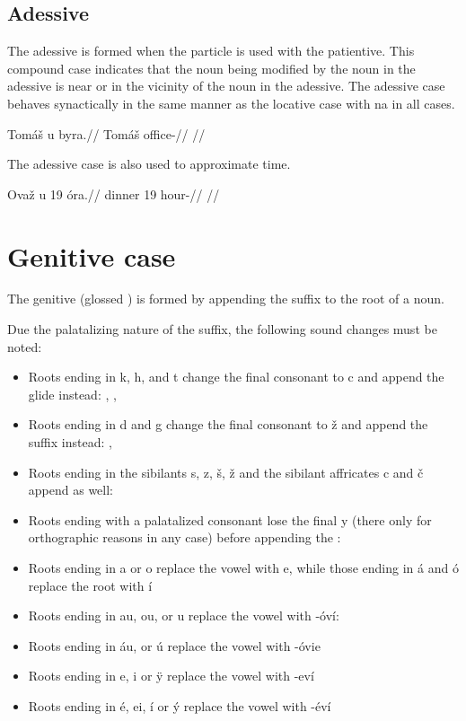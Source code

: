 \subsection{Adessive}
The adessive is formed when the particle  is used with the patientive. This compound case indicates that the noun being modified by the noun in the adessive is near or in the vicinity of the noun in the adessive. The adessive case behaves synactically in the same manner as the locative case with na in all cases.

\pex
\begingl
\gla Tom\'a\v{s} u byra.//
\glb Tom\'a\v{s}  office-//
\glft {}//
\endgl
\xe

The adessive case is also used to approximate time.

\pex
\begingl
\gla Ova\v{z} u 19 \'ora.//
\glb dinner  19 hour-//
\glft {}//
\endgl
\xe

\section{Genitive case}

The genitive (glossed ) is formed by appending the suffix  to the root of a noun.

Due the palatalizing nature of the suffix, the following sound changes must be noted:

\begin{itemize}
	\item Roots ending in k, h, and t change the final consonant to c and append the glide  instead:  ,  ,  
	\item Roots ending in d and g change the final consonant to \v{z} and append the suffix  instead:  ,  
	\item Roots ending in the sibilants s, z, \v{s}, \v{z} and the sibilant affricates c and \v{c} append  as well:
	\item Roots ending with a palatalized consonant lose the final y (there only for orthographic reasons in any case) before appending the : 
	\item Roots ending in a or o replace the vowel with e, while those ending in \'a and \'o replace the root with \'i
	\item Roots ending in au, ou, or u replace the vowel with -\'ov\'i:  
	\item Roots ending in \'au, or \'u replace the vowel with -\'ovie
	\item Roots ending in e, i or \"y replace the vowel with -ev\'i
	\item Roots ending in \'e, ei, \'i or \'y replace the vowel with -\'ev\'i
\end{itemize}


